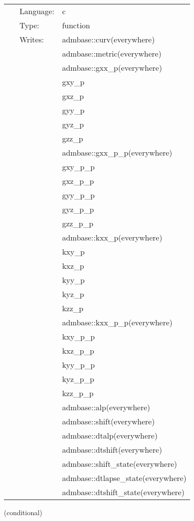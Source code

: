 \documentclass{article}
\begin{document}
 \begin{tabular*}{160mm}{cll} 
~ & Language:  & c \\ 
~ & Type:  & function \\ 
~ & Writes:  & admbase::curv(everywhere) \\ 
~& ~ &admbase::metric(everywhere)\\ 
~& ~ &admbase::gxx\_p(everywhere)\\ 
~& ~ &gxy\_p\\ 
~& ~ &gxz\_p\\ 
~& ~ &gyy\_p\\ 
~& ~ &gyz\_p\\ 
~& ~ &gzz\_p\\ 
~& ~ &admbase::gxx\_p\_p(everywhere)\\ 
~& ~ &gxy\_p\_p\\ 
~& ~ &gxz\_p\_p\\ 
~& ~ &gyy\_p\_p\\ 
~& ~ &gyz\_p\_p\\ 
~& ~ &gzz\_p\_p\\ 
~& ~ &admbase::kxx\_p(everywhere)\\ 
~& ~ &kxy\_p\\ 
~& ~ &kxz\_p\\ 
~& ~ &kyy\_p\\ 
~& ~ &kyz\_p\\ 
~& ~ &kzz\_p\\ 
~& ~ &admbase::kxx\_p\_p(everywhere)\\ 
~& ~ &kxy\_p\_p\\ 
~& ~ &kxz\_p\_p\\ 
~& ~ &kyy\_p\_p\\ 
~& ~ &kyz\_p\_p\\ 
~& ~ &kzz\_p\_p\\ 
~& ~ &admbase::alp(everywhere)\\ 
~& ~ &admbase::shift(everywhere)\\ 
~& ~ &admbase::dtalp(everywhere)\\ 
~& ~ &admbase::dtshift(everywhere)\\ 
~& ~ &admbase::shift\_state(everywhere)\\ 
~& ~ &admbase::dtlapse\_state(everywhere)\\ 
~& ~ &admbase::dtshift\_state(everywhere)\\ 
\end{tabular*} 


\vspace{5mm}

   (conditional) 
\end{document}
